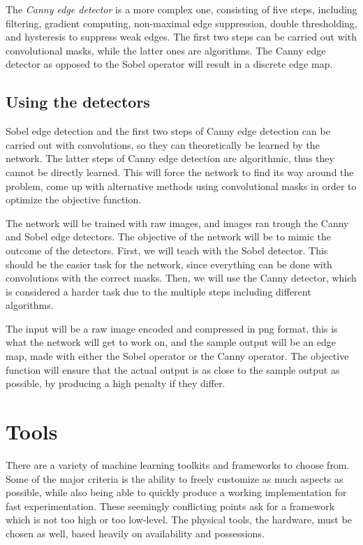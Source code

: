 \documentclass[12pt]{report}
\begin{document}
The \textit{Canny edge detector} \cite{canny} is a more complex one, consisting of five steps, including filtering, gradient computing, non-maximal edge suppression, double thresholding, and hysteresis to suppress weak edges. The first two steps can be carried out with convolutional masks, while the latter ones are algorithms. The Canny edge detector as opposed to the Sobel operator will result in a discrete edge map.
\subsection{Using the detectors}
Sobel edge detection and the first two steps of Canny edge detection can be carried out with convolutions, so they can theoretically be learned by the network. The latter steps of Canny edge detection are algorithmic, thus they cannot be directly learned.
This will force the network to find its way around the problem, come up with alternative methods using convolutional masks in order to optimize the objective function.

The network will be trained with raw images, and images ran trough the Canny and Sobel edge detectors. The objective of the network will be to mimic the outcome of the detectors. First, we will teach with the Sobel detector. This should be the easier task for the network, since everything can be done with convolutions with the correct masks. Then, we will use the Canny detector, which is considered a harder task due to the multiple steps including different algorithms.

The input will be a raw image encoded and compressed in png format, this is what the network will get to work on, and the sample output will be an edge map, made with either the Sobel operator or the Canny operator. The objective function will ensure that the actual output is as close to the sample output as possible, by producing a high penalty if they differ.
\section{Tools}
There are a variety of machine learning toolkits and frameworks to choose from. Some of the major criteria is the ability to freely customize as much aspects as possible, while also being able to quickly produce a working implementation for fast experimentation. These seemingly conflicting points ask for a framework which is not too high or too low-level. The physical tools, the hardware, must be chosen as well, based heavily on availability and possessions.
\end{document}
